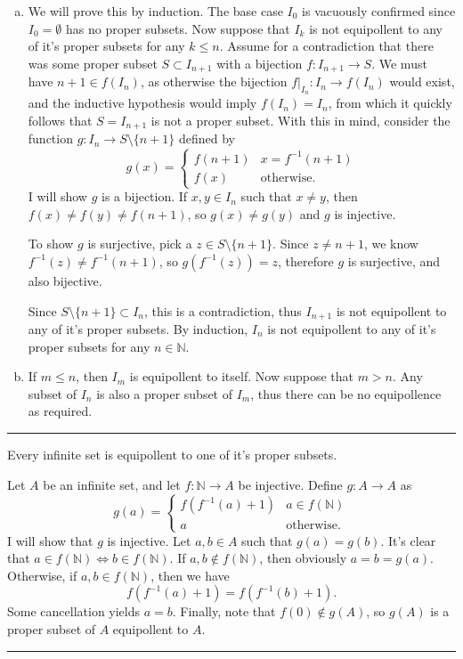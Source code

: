 \begin{solution}
    \begin{enumerate}[(a)]
        \item We will prove this by induction. The base case $I_0$ is vacuously confirmed since $I_0 = \emptyset$ has no proper subsets. Now suppose that $I_k$ is not equipollent to any of it's proper subsets for any $k\le n$. Assume for a contradiction that there was some proper subset $S\subset I_{n+1}$ with a bijection $f:I_{n+1}\to S$. We must have $n+1\in f(I_n)$, as otherwise the bijection $f|_{I_n}:I_n\to f(I_n)$ would exist, and the inductive hypothesis would imply $f(I_n) = I_n$, from which it quickly follows that $S = I_{n+1}$ is not a proper subset. With this in mind, consider the function $g:I_n\to S\setminus\{n+1\}$ defined by
        $$g(x) = \begin{cases}
            f(n+1) & x = f^{-1}(n+1) \\
            f(x) & \text{otherwise.}
        \end{cases}$$
        I will show $g$ is a bijection. If $x,y\in I_n$ such that $x\ne y$, then $f(x)\ne f(y)\ne f(n+1)$, so $g(x)\ne g(y)$ and $g$ is injective.

        To show $g$ is surjective, pick a $z\in S\setminus\{n+1\}$. Since $z\ne n+1$, we know $f^{-1}(z)\ne f^{-1}(n+1)$, so $g(f^{-1}(z)) = z$, therefore $g$ is surjective, and also bijective.
        
        Since $S\setminus\{n+1\}\subset I_n$, this is a contradiction, thus $I_{n+1}$ is not equipollent to any of it's proper subsets. By induction, $I_n$ is not equipollent to any of it's proper subsets for any $n\in\mathbb{N}$.
        \item If $m\le n$, then $I_m$ is equipollent to itself. Now suppose that $m > n$. Any subset of $I_n$ is also a proper subset of $I_m$, thus there can be no equipollence as required.
    \end{enumerate}
\end{solution}
\hrule

\begin{exercise}
    Every infinite set is equipollent to one of it's proper subsets.
\end{exercise}
\begin{solution}
    Let $A$ be an infinite set, and let $f:\mathbb{N}\to A$ be injective. Define $g:A\to A$ as
    $$g(a) = \begin{cases}
        f(f^{-1}(a) + 1) & a\in f(\mathbb{N}) \\
        a & \text{otherwise.}
    \end{cases}$$
    I will show that $g$ is injective. Let $a,b\in A$ such that $g(a) = g(b)$. It's clear that $a\in f(\mathbb{N}) \iff b\in f(\mathbb{N})$. If $a,b\notin f(\mathbb{N})$, then obviously $a = b = g(a)$. Otherwise, if $a,b\in f(\mathbb{N})$, then we have $$f(f^{-1}(a)+1) = f(f^{-1}(b)+1).$$
    Some cancellation yields $a = b$. Finally, note that $f(0)\notin g(A)$, so $g(A)$ is a proper subset of $A$ equipollent to $A$.
\end{solution}
\hrule

